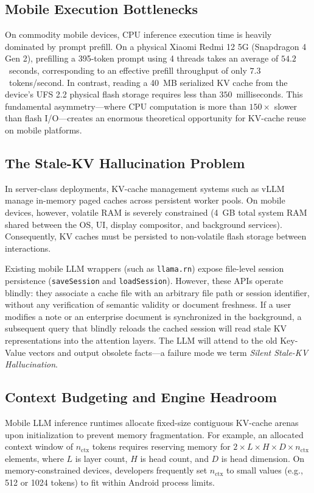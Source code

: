 \subsection{Mobile Execution Bottlenecks}
On commodity mobile devices, CPU inference execution time is heavily dominated by prompt prefill. On a physical Xiaomi Redmi 12 5G (Snapdragon 4 Gen 2), prefilling a 395-token prompt using 4 threads takes an average of $54.2$~seconds, corresponding to an effective prefill throughput of only $7.3$~tokens/second. In contrast, reading a 40~MB serialized KV cache from the device's UFS 2.2 physical flash storage requires less than $350$~milliseconds. This fundamental asymmetry—where CPU computation is more than $150\times$ slower than flash I/O—creates an enormous theoretical opportunity for KV-cache reuse on mobile platforms.

\subsection{The Stale-KV Hallucination Problem}
In server-class deployments, KV-cache management systems such as vLLM~\cite{kwon2023vllm} manage in-memory paged caches across persistent worker pools. On mobile devices, however, volatile RAM is severely constrained (4~GB total system RAM shared between the OS, UI, display compositor, and background services). Consequently, KV caches must be persisted to non-volatile flash storage between interactions.

Existing mobile LLM wrappers (such as \texttt{llama.rn}) expose file-level session persistence (\texttt{saveSession} and \texttt{loadSession}). However, these APIs operate blindly: they associate a cache file with an arbitrary file path or session identifier, without any verification of semantic validity or document freshness. If a user modifies a note or an enterprise document is synchronized in the background, a subsequent query that blindly reloads the cached session will read stale KV representations into the attention layers. The LLM will attend to the old Key-Value vectors and output obsolete facts—a failure mode we term \emph{Silent Stale-KV Hallucination}.

\subsection{Context Budgeting and Engine Headroom}
Mobile LLM inference runtimes allocate fixed-size contiguous KV-cache arenas upon initialization to prevent memory fragmentation. For example, an allocated context window of $n_{\text{ctx}}$ tokens requires reserving memory for $2 \times L \times H \times D \times n_{\text{ctx}}$ elements, where $L$ is layer count, $H$ is head count, and $D$ is head dimension. On memory-constrained devices, developers frequently set $n_{\text{ctx}}$ to small values (e.g., 512 or 1024 tokens) to fit within Android process limits. 

